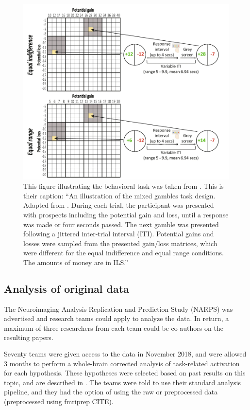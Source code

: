 \documentclass[a4paper,doc,natbib]{apa6}
\begin{document}
\begin{figure}[!htb]
    \includegraphics[width=\textwidth]{figures/botvinik-nezer_fig1.png}\vspace{.5cm}
    \caption{\label{fig:task} This figure illustrating the behavioral task was taken from \cite{botvinik-nezer_fmri_2019}. This is their caption: ``An illustration of the mixed gambles task design. Adapted from \cite{tom_neural_2007}. During each trial, the participant was presented with prospects including the potential gain and loss, until a response was made or four seconds passed. The next gamble was presented following a jittered inter-trial interval (ITI). Potential gains and losses were sampled from the presented gain/loss matrices, which were different for the equal indifference and equal range conditions. The amounts of money are in ILS.''}
\end{figure}

\subsection{Analysis of original data}
The Neuroimaging Analysis Replication and Prediction Study (NARPS) was advertised and research teams could apply to analyze the data. In return, a maximum of three researchers from each team could be co-authors on the resulting papers.

Seventy teams were given access to the data in November 2018, and were allowed 3 months to perform a whole-brain corrected analysis of task-related activation for each hypothesis. These hypotheses were selected based on past results on this topic, and are described in \cite{botvinik-nezer_fmri_2019}. The teams were told to use their standard analysis pipeline, and they had the option of using the raw or preprocessed data (preprocessed using fmriprep CITE). 
\end{document}
